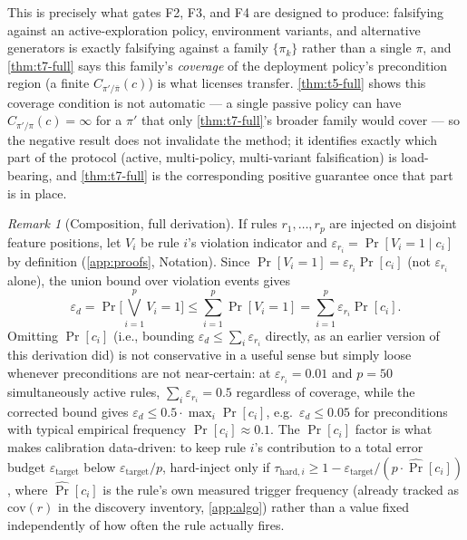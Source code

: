\documentclass[11pt]{article}
\theoremstyle{plain}
\theoremstyle{definition}
\theoremstyle{remark}
\newtheorem{remark}[theorem]{Remark}
\begin{document}
This is precisely what gates F2, F3, and F4 are designed to produce: falsifying against an active-exploration policy, environment variants, and alternative generators is exactly falsifying against a family $\{\pi_k\}$ rather than a single $\pi$, and \autoref{thm:t7-full} says this family's \emph{coverage} of the deployment policy's precondition region (a finite $C_{\pi'/\bar\pi}(c)$) is what licenses transfer. \autoref{thm:t5-full} shows this coverage condition is not automatic --- a single passive policy can have $C_{\pi'/\pi}(c)=\infty$ for a $\pi'$ that only \autoref{thm:t7-full}'s broader family would cover --- so the negative result does not invalidate the method; it identifies exactly which part of the protocol (active, multi-policy, multi-variant falsification) is load-bearing, and \autoref{thm:t7-full} is the corresponding positive guarantee once that part is in place.

\begin{remark}[Composition, full derivation]
If rules $r_1,\dots,r_p$ are injected on disjoint feature positions, let $V_i$ be rule $i$'s violation indicator and $\varepsilon_{r_i}=\Pr[V_i=1\mid c_i]$ by definition (\autoref{app:proofs}, Notation). Since $\Pr[V_i=1]=\varepsilon_{r_i}\Pr[c_i]$ (not $\varepsilon_{r_i}$ alone), the union bound over violation events gives
$$\varepsilon_d = \Pr\Big[\bigvee_{i=1}^p V_i=1\Big] \le \sum_{i=1}^p\Pr[V_i=1] = \sum_{i=1}^p\varepsilon_{r_i}\Pr[c_i].$$
Omitting $\Pr[c_i]$ (i.e., bounding $\varepsilon_d\le\sum_i\varepsilon_{r_i}$ directly, as an earlier version of this derivation did) is not conservative in a useful sense but simply loose whenever preconditions are not near-certain: at $\varepsilon_{r_i}=0.01$ and $p=50$ simultaneously active rules, $\sum_i\varepsilon_{r_i}=0.5$ regardless of coverage, while the corrected bound gives $\varepsilon_d\le0.5\cdot\max_i\Pr[c_i]$, e.g.\ $\varepsilon_d\le0.05$ for preconditions with typical empirical frequency $\Pr[c_i]\approx0.1$. The $\Pr[c_i]$ factor is what makes calibration data-driven: to keep rule $i$'s contribution to a total error budget $\varepsilon_{\mathrm{target}}$ below $\varepsilon_{\mathrm{target}}/p$, hard-inject only if $\tau_{\mathrm{hard},i}\ge1-\varepsilon_{\mathrm{target}}/(p\cdot\widehat{\Pr}[c_i])$, where $\widehat{\Pr}[c_i]$ is the rule's own measured trigger frequency (already tracked as $\mathrm{cov}(r)$ in the discovery inventory, \autoref{app:algo}) rather than a value fixed independently of how often the rule actually fires.
\end{remark}
\end{document}
